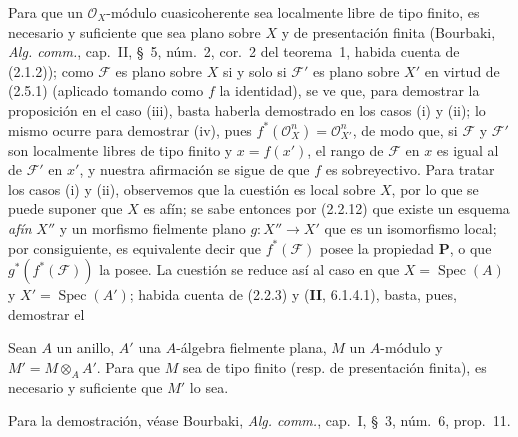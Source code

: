 Para que un $\mathcal O_X$-módulo cuasicoherente sea localmente libre de tipo
finito, es necesario y suficiente que sea plano sobre $X$ y de presentación
finita (Bourbaki, \emph{Alg. comm.}, cap.~II, \S~5, núm.~2, cor.~2 del
teorema~1, habida cuenta de (2.1.2)); como $\mathscr F$ es plano sobre $X$ si
y solo si $\mathscr F'$ es plano sobre $X'$ en virtud de (2.5.1) (aplicado
tomando como $f$ la identidad), se ve que, para demostrar la proposición en el
caso (iii), basta haberla demostrado en los casos (i) y (ii); lo mismo ocurre
para demostrar (iv), pues
$f^*(\mathcal O_X^n)=\mathcal O_{X'}^n$, de modo que, si $\mathscr F$ y
$\mathscr F'$ son localmente libres de tipo finito y $x=f(x')$, el rango de
$\mathscr F$ en $x$ es igual al de $\mathscr F'$ en $x'$, y nuestra afirmación
se sigue de que $f$ es sobreyectivo. Para tratar los casos (i) y (ii),
observemos que la cuestión es local sobre $X$, por lo que se puede suponer que
$X$ es afín; se sabe entonces por (2.2.12) que existe un esquema \emph{afín} $X''$ y
un morfismo fielmente plano $g:X''\to X'$ que es un isomorfismo local; por
consiguiente, es equivalente decir que $f^*(\mathscr F)$ posee la propiedad
$\boldsymbol{P}$, o que $g^*(f^*(\mathscr F))$ la posee. La cuestión se reduce así al
caso en que $X=\operatorname{Spec}(A)$ y $X'=\operatorname{Spec}(A')$; habida
cuenta de (2.2.3) y (\textbf{II}, 6.1.4.1), basta, pues, demostrar el

\begin{lemma}[2.5.3]
\label{IV.2.5.3-fr}
Sean $A$ un anillo, $A'$ una $A$-álgebra fielmente plana, $M$ un $A$-módulo y
$M'=M\otimes_A A'$. Para que $M$ sea de tipo finito \textup{(resp.} de presentación
finita), es necesario y suficiente que $M'$ lo sea.
\end{lemma}

Para la demostración, véase Bourbaki, \emph{Alg. comm.}, cap.~I, \S~3,
núm.~6, prop.~11.

